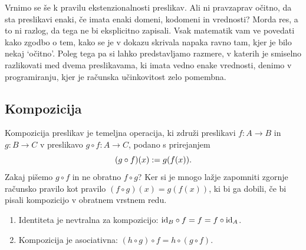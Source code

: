 Vrnimo se še k pravilu ekstenzionalnosti preslikav. Ali ni pravzaprav očitno, da sta
preslikavi enaki, če imata enaki domeni, kodomeni in vrednosti? Morda res, a to ni razlog,
da tega ne bi eksplicitno zapisali. Vsak matematik vam ve povedati kako zgodbo o tem,
kako se je v dokazu skrivala napaka ravno tam, kjer je bilo nekaj `očitno'. Poleg tega
pa si lahko predstavljamo razmere, v katerih je smiselno razlikovati med dvema
preslikavama, ki imata vedno enake vrednosti, denimo v programiranju, kjer je računska učinkovitost
zelo pomembna.

\subsection{Kompozicija}
\label{sec:kompozicija}

Kompozicija preslikav je temeljna operacija, ki združi preslikavi $f : A \to B$ in $g : B \to C$ v preslikavo
$g \circ f : A \to C$, podano s prirejanjem
%
\begin{equation*}
  (g \circ f)(x) \dfeq g (f (x)).
\end{equation*}
%
Zakaj pišemo $g \circ f$ in ne obratno $f \circ g$?  Ker si je mnogo lažje zapomniti zgornje računsko pravilo kot pravilo $(f \circ g)(x) = g(f(x))$, ki bi ga dobili, če bi pisali kompozicijo v obratnem vrstnem redu.

\begin{trditev}
  \parbox{0pt}{}
  \begin{enumerate}
  \item Identiteta je nevtralna za kompozicijo: $\id[B] \circ f = f = f \circ \id[A]$.
  \item Kompozicija je asociativna: $(h \circ g) \circ f = h \circ (g \circ f)$.
  \end{enumerate}
\end{trditev}

